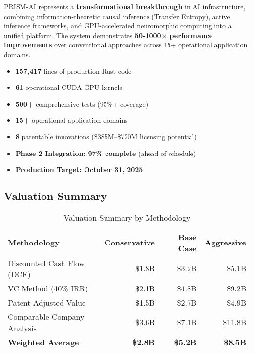 \documentclass[11pt,letterpaper]{article}
\begin{document}
PRISM-AI represents a \textbf{transformational breakthrough} in AI infrastructure, combining information-theoretic causal inference (Transfer Entropy), active inference frameworks, and GPU-accelerated neuromorphic computing into a unified platform. The system demonstrates \textbf{50-1000× performance improvements} over conventional approaches across 15+ operational application domains.

\begin{tcolorbox}[colback=lightgray,colframe=successgreen,title=Key Highlights]
\begin{itemize}[leftmargin=*]
    \item \textbf{157,417} lines of production Rust code
    \item \textbf{61} operational CUDA GPU kernels
    \item \textbf{500+} comprehensive tests (95\%+ coverage)
    \item \textbf{15+} operational application domains
    \item \textbf{8} patentable innovations (\$385M--\$720M licensing potential)
    \item \textbf{Phase 2 Integration: 97\% complete} (ahead of schedule)
    \item \textbf{Production Target: October 31, 2025}
\end{itemize}
\end{tcolorbox}

\subsection{Valuation Summary}

\begin{table}[H]
\centering
\begin{tabularx}{\textwidth}{Xrrr}
\toprule
\textbf{Methodology} & \textbf{Conservative} & \textbf{Base Case} & \textbf{Aggressive} \\
\midrule
Discounted Cash Flow (DCF) & \$1.8B & \$3.2B & \$5.1B \\
VC Method (40\% IRR) & \$2.1B & \$4.8B & \$9.2B \\
Patent-Adjusted Value & \$1.5B & \$2.7B & \$4.9B \\
Comparable Company Analysis & \$3.6B & \$7.1B & \$11.8B \\
\midrule
\textbf{Weighted Average} & \textbf{\$2.8B} & \textbf{\$5.2B} & \textbf{\$8.5B} \\
\bottomrule
\end{tabularx}
\caption{Valuation Summary by Methodology}
\end{table}
\end{document}
